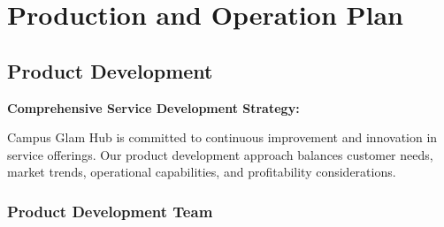 \section{Production and Operation Plan}

\subsection{Product Development}

\textbf{Comprehensive Service Development Strategy:}

Campus Glam Hub is committed to continuous improvement and innovation in service offerings. Our product development approach balances customer needs, market trends, operational capabilities, and profitability considerations.

\subsubsection{Product Development Team}

